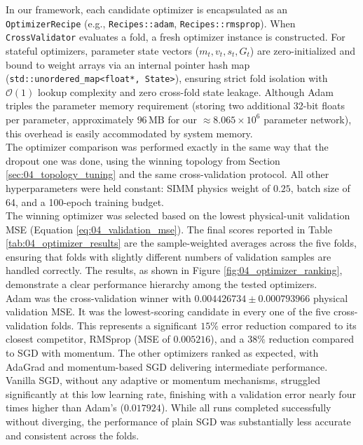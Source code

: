 In our \cpp framework, each candidate optimizer is encapsulated as an \texttt{OptimizerRecipe} (e.g., \texttt{Recipes::adam}, \texttt{Recipes::rmsprop}). When \texttt{CrossValidator} evaluates a fold, a fresh optimizer instance is constructed. For stateful optimizers, parameter state vectors ($m_t, v_t, s_t, G_t$) are zero-initialized and bound to weight arrays via an internal pointer hash map (\texttt{std::unordered\_map<float*, State>}), ensuring strict fold isolation with $\mathcal{O}(1)$ lookup complexity and zero cross-fold state leakage. Although Adam triples the parameter memory requirement (storing two additional 32-bit floats per parameter, approximately $96\,\mathrm{MB}$ for our $\approx 8.065\times 10^6$ parameter network), this overhead is easily accommodated by system memory.\\

The optimizer comparison was performed exactly in the same way that the dropout one was done, using the winning topology from Section \ref{sec:04_topology_tuning} and the same cross-validation protocol. All other hyperparameters were held constant: SIMM physics weight of $0.25$, batch size of 64, and a 100-epoch training budget.\\

The winning optimizer was selected based on the lowest physical-unit validation MSE (Equation \eqref{eq:04_validation_mse}). The final scores reported in Table \ref{tab:04_optimizer_results} are the sample-weighted averages across the five folds, ensuring that folds with slightly different numbers of validation samples are handled correctly. The results, as shown in Figure \ref{fig:04_optimizer_ranking}, demonstrate a clear performance hierarchy among the tested optimizers.\\

Adam was the cross-validation winner with $0.004426734\pm0.000793966$ physical validation MSE. It was the lowest-scoring candidate in every one of the five cross-validation folds. This represents a significant $15\%$ error reduction compared to its closest competitor, RMSprop (MSE of $0.005216$), and a $38\%$ reduction compared to SGD with momentum. The other optimizers ranked as expected, with AdaGrad and momentum-based SGD delivering intermediate performance. Vanilla SGD, without any adaptive or momentum mechanisms, struggled significantly at this low learning rate, finishing with a validation error nearly four times higher than Adam's ($0.017924$). While all runs completed successfully without diverging, the performance of plain SGD was substantially less accurate and consistent across the folds.\\

